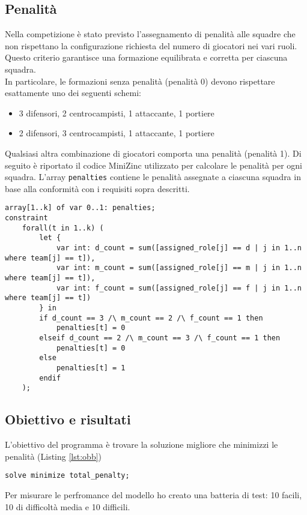 \documentclass{article}
\begin{document}
\begin{multicols*}{2}
\subsection{Penalità}
Nella competizione è stato previsto l'assegnamento di penalità alle squadre che non rispettano la configurazione richiesta del numero di giocatori nei vari ruoli. Questo criterio garantisce una formazione equilibrata e corretta per ciascuna squadra. 
\\
In particolare, le formazioni senza penalità (penalità 0) devono rispettare esattamente uno dei seguenti schemi:
\begin{itemize}
    \item 3 difensori, 2 centrocampisti, 1 attaccante, 1 portiere
    \item 2 difensori, 3 centrocampisti, 1 attaccante, 1 portiere
\end{itemize} 
Qualsiasi altra combinazione di giocatori comporta una penalità (penalità 1).
Di seguito è riportato il codice MiniZinc utilizzato per calcolare le penalità per ogni squadra. L'array \texttt{penalties} contiene le penalità assegnate a ciascuna squadra in base alla conformità con i requisiti sopra descritti.
\begin{lstlisting}[style=minizinc, caption={Penalità}, label={lst:penalita}]
array[1..k] of var 0..1: penalties;
constraint
    forall(t in 1..k) (
        let {
            var int: d_count = sum([assigned_role[j] == d | j in 1..n where team[j] == t]),
            var int: m_count = sum([assigned_role[j] == m | j in 1..n where team[j] == t]),
            var int: f_count = sum([assigned_role[j] == f | j in 1..n where team[j] == t])
        } in
        if d_count == 3 /\ m_count == 2 /\ f_count == 1 then
            penalties[t] = 0
        elseif d_count == 2 /\ m_count == 3 /\ f_count == 1 then
            penalties[t] = 0
        else
            penalties[t] = 1
        endif
    );
\end{lstlisting}

\subsection{Obiettivo e risultati}
L'obiettivo del programma è trovare la soluzione migliore che minimizzi le penalità (Listing \ref{lst:obb})

\begin{lstlisting}[style=minizinc, caption={Obiettivo}, label={lst:obb}]
    solve minimize total_penalty;
\end{lstlisting}
\end{multicols*}

Per misurare le perfromance del modello ho creato una batteria di test: 10 facili, 10 di difficoltà media e 10 difficili.
\end{document}
